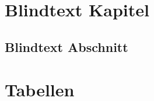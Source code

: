 \begin{appendices}

\chapter{Blindtext Kapitel}
\blindtext


\section{Blindtext Abschnitt}
\blindtext


\begin{comment}
--------------------------------------------------------------------------------
\end{comment}
\chapter{Tabellen}


\end{appendices}
